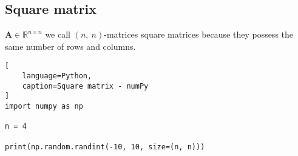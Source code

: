 \subsection{Square matrix}

$\bm{A} \in \mathbb{R}^{n\times n}$
we call $(n,\ n)$-matrices square matrices because they possess the same number of rows and columns.


\begin{lstlisting}[
    language=Python,
    caption=Square matrix - numPy
]
import numpy as np

n = 4

print(np.random.randint(-10, 10, size=(n, n)))
\end{lstlisting}


